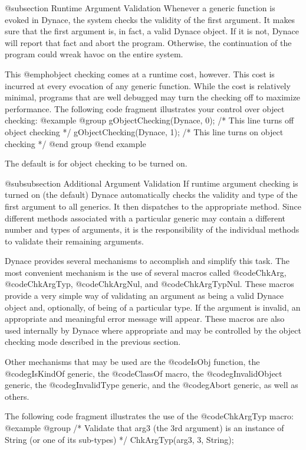 @subsection Runtime Argument Validation
Whenever a generic function is evoked in Dynace, the system checks the
validity of the first argument.  It makes sure that the first argument
is, in fact, a valid Dynace object.  If it is not, Dynace will report that fact
and abort the program.  Otherwise, the continuation of the program could wreak
havoc on the entire system.

This @emph{object checking} comes at a runtime cost, however.  This cost
is incurred at every evocation of any generic function.  While the cost
is relatively minimal, programs that are well debugged may turn the
checking off to maximize performance.  The following code fragment
illustrates your control over object checking:
@example
@group
gObjectChecking(Dynace, 0);  /* This line turns off object checking */
gObjectChecking(Dynace, 1);  /* This line turns on  object checking */
@end group
@end example

The default is for object checking to be turned on.


@subsubsection Additional Argument Validation
If runtime argument checking is turned on (the default) Dynace
automatically checks the validity and type of the first argument to all
generics.  It then dispatches to the appropriate method.  Since
different methods associated with a particular generic may contain a
different number and types of arguments, it is the responsibility of the
individual methods to validate their remaining arguments.

Dynace provides several mechanisms to accomplish and simplify this task.
The most convenient mechanism is the use of several macros called
@code{ChkArg}, @code{ChkArgTyp}, @code{ChkArgNul}, and
@code{ChkArgTypNul}.  These macros provide a very simple way of
validating an argument as being a valid Dynace object and, optionally,
of being of a particular type.  If the argument is invalid, an
appropriate and meaningful error message will appear.  These macros are
also used internally by Dynace where appropriate and may be controlled
by the object checking mode described in the previous section.

Other mechanisms that may be used are the @code{IsObj} function, the
@code{gIsKindOf} generic, the @code{ClassOf} macro, the
@code{gInvalidObject} generic, the @code{gInvalidType} generic, and the
@code{gAbort} generic, as well as others.

The following code fragment illustrates the use of the @code{ChkArgTyp}
macro:
@example
@group
/*  Validate that arg3 (the 3rd argument) is an instance of String
    (or one of its sub-types)  */
ChkArgTyp(arg3, 3, String);

